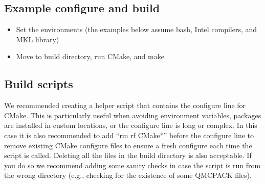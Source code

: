 \documentclass[letterpaper,10pt,english]{sphinxmanual}
\begin{document}
\subsection{Example configure and build}
\label{\detokenize{installation:example-configure-and-build}}\begin{itemize}
\item {} 
Set the environments (the examples below assume bash, Intel compilers, and MKL library)

\begin{sphinxVerbatim}[commandchars=\\\{\}]
 
 
 
 
 
 
\end{sphinxVerbatim}

\item {} 
Move to build directory, run CMake, and make

\begin{sphinxVerbatim}[commandchars=\\\{\}]
 
   
  
\end{sphinxVerbatim}

\end{itemize}


\subsection{Build scripts}
\label{\detokenize{installation:build-scripts}}
We recommended creating a helper script that contains the
configure line for CMake.  This is particularly useful when avoiding
environment variables, packages are installed in custom locations,
or the configure line is long or complex.  In this case it is also
recommended to add “rm \sphinxhyphen{}rf CMake*” before the configure line to remove
existing CMake configure files to ensure a fresh configure each time
the script is called. Deleting all the files in the build
directory is also acceptable. If you do so we recommend adding some sanity
checks in case the script is run from the wrong directory (e.g.,
checking for the existence of some QMCPACK files).
\end{document}
